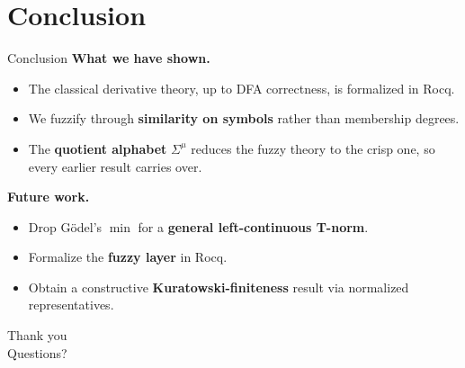 \documentclass[aspectratio=169]{beamer}
\newcommand{\cut}{\mu}
\begin{document}
\section{Conclusion}

\begin{frame}{Conclusion}
  \textbf{What we have shown.}
  \begin{itemize}
    \item The classical derivative theory, up to DFA correctness, is
          formalized in Rocq.
    \item We fuzzify through \textbf{similarity on symbols} rather than
          membership degrees.
    \item The \textbf{quotient alphabet} $\Sigma^\cut$ reduces the fuzzy theory
          to the crisp one, so every earlier result carries over.
  \end{itemize}
  \medskip
  \textbf{Future work.}
  \begin{itemize}
    \item Drop G\"odel's $\min$ for a \textbf{general left-continuous T-norm}.
    \item Formalize the \textbf{fuzzy layer} in Rocq.
    \item Obtain a constructive \textbf{Kuratowski-finiteness} result via
          normalized representatives.
  \end{itemize}
\end{frame}

\begin{frame}
  \vfill
  \begin{center}
    {\Huge Thank you}\\[0.6em]
    {\large Questions?}
  \end{center}
  \vfill
\end{frame}
\end{document}
